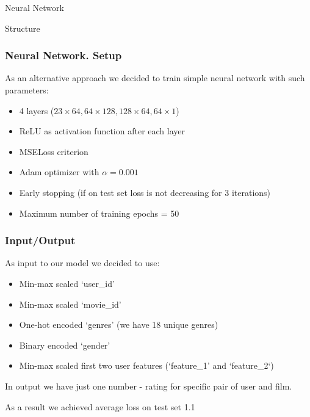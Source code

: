 \documentclass[pdf,10pt]{beamer}
\begin{document}
\begin{section}{Neural Network}

 \begin{subsection}{Structure}

   \begin{frame}
     \frametitle{Neural Network. Setup}

     As an alternative approach we decided to train simple neural network with such parameters:
     \begin{itemize}
       \item 4 layers ($23\times64, 64\times128, 128\times64, 64\times1$)
       \item ReLU as activation function after each layer
       \item MSELoss criterion
       \item Adam optimizer with $\alpha = 0.001$
       \item Early stopping (if on test set loss is not decreasing for 3 iterations)
       \item Maximum number of training epochs = 50
     \end{itemize}
   \end{frame}

   \begin{frame}
     \frametitle{Input/Output}
     As input to our model we decided to use:
     \begin{itemize}
       \item Min-max scaled `user\_id'
       \item Min-max scaled `movie\_id'
       \item One-hot encoded `genres' (we have 18 unique genres)
       \item Binary encoded `gender'
       \item Min-max scaled first two user features (`feature\_1' and `feature\_2`)
     \end{itemize}

     In output we have just one number - rating for specific pair of user and film.

     As a result we achieved average loss on test set 1.1
   \end{frame}

 \end{subsection}

\end{section}
\end{document}
